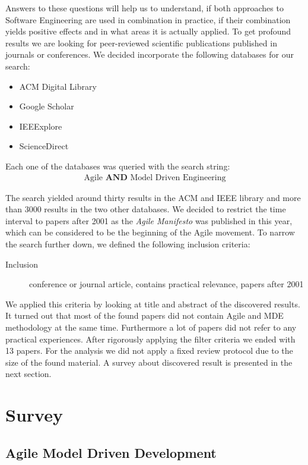 \documentclass[10pt, a4paper, twocolumn]{article}
\begin{document}
Answers to these questions will help us to understand, if both approaches to Software Engineering are used in combination in practice, if their combination yields positive effects and in what areas it is actually applied. 
To get profound results we are looking for peer-reviewed scientific publications published in journals or conferences. 
We decided incorporate the following databases for our search:
\begin{itemize}
\item ACM Digital Library
\item Google Scholar
\item IEEExplore
\item ScienceDirect
\end{itemize}

Each one of the databases was queried with the search string:
\begin{align}
	\text{Agile } \textbf{AND} \text{ Model Driven Engineering}
\end{align}

The search yielded around thirty results in the ACM and IEEE library and more than 3000 results in the two other databases. 
We decided to restrict the time interval to papers after 2001 as the \emph{Agile Manifesto} \cite{secondaryAgileManifesto} was published in this year, which can be considered to be the beginning of the Agile movement.
To narrow the search further down, we defined the following inclusion criteria:
\begin{description}
\item[Inclusion] conference or journal article, contains practical relevance, papers after 2001
\end{description}

We applied this criteria by looking at title and abstract of the discovered results. 
It turned out that most of the found papers did not contain Agile and MDE methodology at the same time.
Furthermore a lot of papers did not refer to any practical experiences.
After rigorously applying the filter criteria we ended with 13 papers. 
For the analysis we did not apply a fixed review protocol due to the size of the found material.
A survey about discovered result is presented in the next section.

\section{Survey}

\subsection{Agile Model Driven Development}
\end{document}
